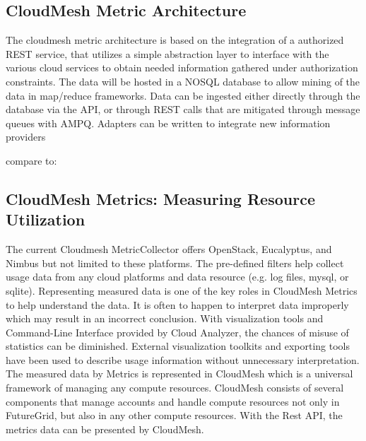 \documentclass{tex/sig-alternate}
\begin{document}
{\subsection{CloudMesh Metric Architecture}

The cloudmesh metric architecture is based on the integration of a
authorized REST service, that utilizes a simple abstraction layer to interface
with the various cloud services to obtain needed information gathered
under authorization constraints. The data will be hosted in a NOSQL
database to allow mining of the data in map/reduce frameworks. Data
can be ingested either directly through the database via the API, or
through REST calls that are mitigated through message queues with
AMPQ. Adapters can be written to integrate new information providers 


compare to: \cite{smith13info}

\subsection{CloudMesh Metrics: Measuring Resource Utilization}

 
The current Cloudmesh MetricCollector offers OpenStack, Eucalyptus, and Nimbus but not
limited to these platforms. The pre-defined filters help collect usage
data from any cloud platforms and data resource (e.g. log files,
mysql, or sqlite). Representing measured data is one of the key roles
in CloudMesh Metrics to help understand the data. It is often to
happen to interpret data improperly which may result in an incorrect
conclusion. With visualization tools and Command-Line Interface
provided by Cloud Analyzer, the chances of misuse of statistics can be
diminished. External visualization toolkits and exporting tools have
been used to describe usage information without unnecessary
interpretation. The measured data by Metrics is represented in
CloudMesh which is a universal framework of managing any compute
resources. CloudMesh consists of several components that manage
accounts and handle compute resources not only in FutureGrid, but also
in any other compute resources. With the Rest API, the metrics data
can be presented by CloudMesh.

 



}
\end{document}
